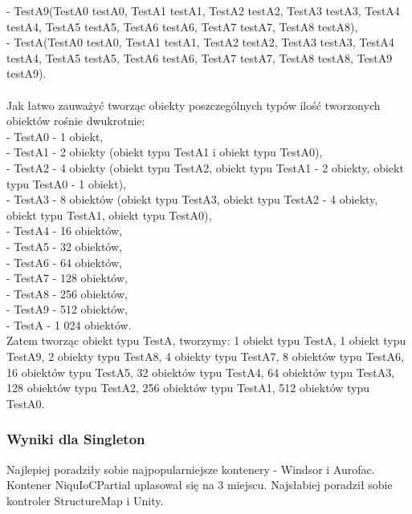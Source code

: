 \documentclass[12pt]{article}
\begin{document}
- TestA9(TestA0 testA0, TestA1 testA1, TestA2 testA2, TestA3 testA3, TestA4 testA4, TestA5 testA5, TestA6 testA6, TestA7 testA7, TestA8 testA8),\\
- TestA(TestA0 testA0, TestA1 testA1, TestA2 testA2, TestA3 testA3, TestA4 testA4, TestA5 testA5, TestA6 testA6, TestA7 testA7, TestA8 testA8, TestA9 testA9).\\
\\
Jak łatwo zauważyć tworząc obiekty poszczególnych typów ilość tworzonych obiektów rośnie dwukrotnie:\\
- TestA0 - 1 obiekt,\\
- TestA1 - 2 obiekty (obiekt typu TestA1 i obiekt typu TestA0),\\
- TestA2 - 4 obiekty (obiekt typu TestA2, obiekt typu TestA1 - 2 obiekty, obiekt typu TestA0 - 1 obiekt),\\
- TestA3 - 8 obiektów (obiekt typu TestA3, obiekt typu TestA2 - 4 obiekty, obiekt typu TestA1, obiekt typu TestA0),\\
- TestA4 - 16 obiektów,\\
- TestA5 - 32 obiektów,\\
- TestA6 - 64 obiektów,\\
- TestA7 - 128 obiektów,\\
- TestA8 - 256 obiektów,\\
- TestA9 - 512 obiektów,\\
- TestA - 1 024 obiektów.\\
Zatem tworząc obiekt typu TestA, tworzymy: 1 obiekt typu TestA, 1 obiekt typu TestA9, 2 obiekty typu TestA8, 4 obiekty typu TestA7, 8 obiektów typu TestA6, 16 obiektów typu TestA5, 32 obiektów typu TestA4, 64 obiektów typu TestA3, 128 obiektów typu TestA2, 256 obiektów typu TestA1, 512 obiektów typu TestA0.

\subsubsection{Wyniki dla Singleton}
Najlepiej poradziły sobie najpopularniejsze kontenery - Windsor i Aurofac. Kontener NiquIoCPartial uplasował się na 3 miejscu. Najsłabiej poradził sobie kontroler StructureMap i Unity.
\end{document}
